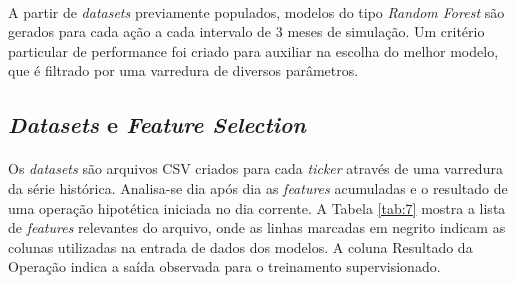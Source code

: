 \paragraph{} A partir de \textit{datasets} previamente populados, modelos do tipo \textit{Random Forest} são gerados para cada ação a cada intervalo de 3 meses de simulação. Um critério particular de performance foi criado para auxiliar na escolha do melhor modelo, que é filtrado por uma varredura de diversos parâmetros.



\FloatBarrier
\subsection{\textit{Datasets} e \textit{Feature Selection}}
\label{sub:dataset_gen}

\paragraph{} Os \textit{datasets} são arquivos CSV criados para cada \textit{ticker} através de uma varredura da série histórica. Analisa-se dia após dia as \textit{features} acumuladas e o resultado de uma operação hipotética iniciada no dia corrente. A Tabela \ref{tab:7} mostra a lista de \textit{features} relevantes do arquivo, onde as linhas marcadas em negrito indicam as colunas utilizadas na entrada de dados dos modelos. A coluna Resultado da Operação indica a saída observada para o treinamento supervisionado.

